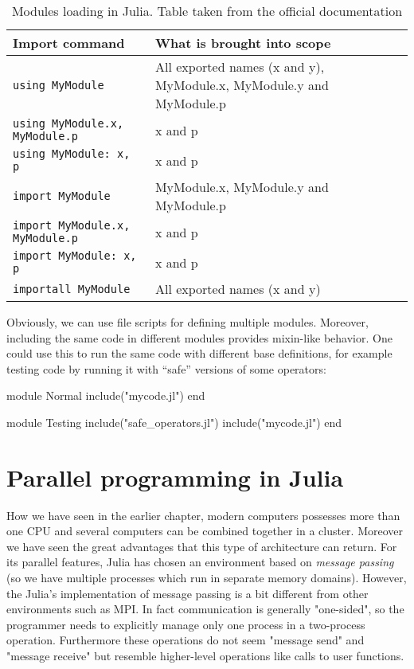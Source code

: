 \begin{table}[htb]
\centering
\caption[Modules loading in Julia]{Modules loading in Julia. Table taken from the official documentation}
\label{tbl:juliaImports}
\begin{tabular}{p{5cm} | p{7cm}}
\toprule
\textbf{Import command}			  & \textbf{What is brought into scope}\\ \midrule
\texttt{using MyModule}			  & All exported names (x and y), MyModule.x, MyModule.y and MyModule.p\\ \midrule
\texttt{using MyModule.x, MyModule.p}     & x and p\\ \midrule
\texttt{using MyModule: x, p}          	  & x and p\\ \midrule
\texttt{import MyModule}	          & MyModule.x, MyModule.y and MyModule.p\\ \midrule
\texttt{import MyModule.x, MyModule.p}	  & x and p\\ \midrule
\texttt{import MyModule: x, p}            & x and p\\ \midrule
\texttt{importall MyModule}               & All exported names (x and y)\\ \midrule
\bottomrule
\end{tabular}
\end{table}

Obviously, we can use file scripts for defining multiple modules. Moreover, including the same code in different modules provides mixin-like behavior. One could use this to run the same code with different base definitions, for example testing code by running it with “safe” versions of some operators:
\begin{julia}
module Normal
include("mycode.jl")
end

module Testing
include("safe_operators.jl")
include("mycode.jl")
end
\end{julia}

\section{Parallel programming in Julia}\label{sec23:parallelJulia}

How we have seen in the earlier chapter, modern computers possesses more than one CPU and several computers can be combined together in a cluster. Moreover we have seen the great advantages that this type of architecture can return. For its parallel features, Julia has chosen an environment based on \textit{message passing} (so we have multiple processes which run in separate memory domains). However, the Julia's implementation of message passing is a bit different from other environments such as MPI. In fact communication is generally "one-sided", so the programmer needs to explicitly manage only one process in a two-process operation. Furthermore these operations do not seem "message send" and "message receive" but resemble higher-level operations like calls to user functions.\\

